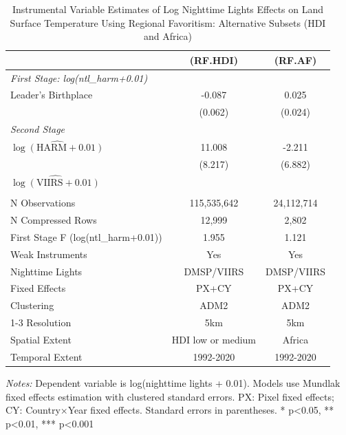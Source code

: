 \begin{table}[htbp]
\centering
\caption{Instrumental Variable Estimates of Log Nighttime Lights Effects on Land Surface Temperature Using Regional Favoritism: Alternative Subsets (HDI and Africa)}
\begin{tabular}{lcc}
\toprule
 & (RF.HDI) & (RF.AF) \\
\midrule
\midrule
\multicolumn{3}{l}{\textit{First Stage: log(ntl\_harm+0.01)}} \\
  Leader's Birthplace & -0.087 & 0.025 \\
 & (0.062) & (0.024) \\
\midrule
\multicolumn{3}{l}{\textit{Second Stage}} \\
$\hat{\log(\text{HARM} + 0.01)}$ & 11.008 & -2.211 \\
 & (8.217) & (6.882) \\
$\hat{\log(\text{VIIRS} + 0.01)}$ &  &  \\
 &  &  \\
\midrule
N Observations & 115,535,642 & 24,112,714 \\
N Compressed Rows & 12,999 & 2,802 \\
First Stage F (log(ntl\_harm+0.01)) & 1.955 & 1.121 \\
Weak Instruments & Yes & Yes \\
\midrule
Nighttime Lights & DMSP/VIIRS & DMSP/VIIRS \\
Fixed Effects & PX+CY & PX+CY \\
Clustering & ADM2 & ADM2 \\
\cmidrule(lr){1-3}
Resolution & 5km & 5km \\
Spatial Extent & HDI low or medium & Africa \\
Temporal Extent & 1992-2020 & 1992-2020 \\
\bottomrule
\end{tabular}
\begin{threeparttable}
\begin{tablenotes}\small
\item \textit{Notes:} Dependent variable is log(nighttime lights + 0.01). Models use Mundlak fixed effects estimation with clustered standard errors. PX: Pixel fixed effects; CY: Country×Year fixed effects. Standard errors in parentheses. * p<0.05, ** p<0.01, *** p<0.001
\end{tablenotes}
\end{threeparttable}
\end{table}